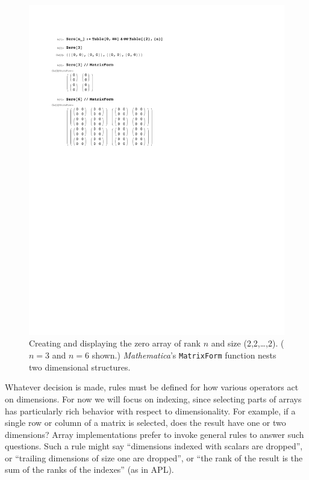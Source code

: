 \documentclass[preprint]{sigplanconf}
\newcommand{\Mathematica}{\textit{Mathematica}}
\newcommand{\code}[1]{\texttt{#1}}
\begin{document}
\begin{figure}
  \centering
  \includegraphics[width=\columnwidth]{fig-mathematica/fig.pdf}
  \caption{\label{fig:mathematica} Creating and displaying the zero array of
rank $n$ and size (2,2,\dots,2). ($n=3$ and $n=6$ shown.) \Mathematica's
\code{MatrixForm} function nests two dimensional structures.}
\end{figure}


Whatever decision is made, rules must be defined for how various operators
act on dimensions. For now we will focus on indexing, since selecting
parts of arrays has particularly rich behavior with respect to
dimensionality. For example, if a single row or column of a matrix is
selected, does the result have one or two dimensions? Array implementations
prefer to invoke general rules to answer such questions. Such a rule might
say ``dimensions indexed with scalars are dropped'', or ``trailing
dimensions of size one are dropped'', or ``the rank of the result
is the sum of the ranks of the indexes'' (as in APL).
\end{document}

